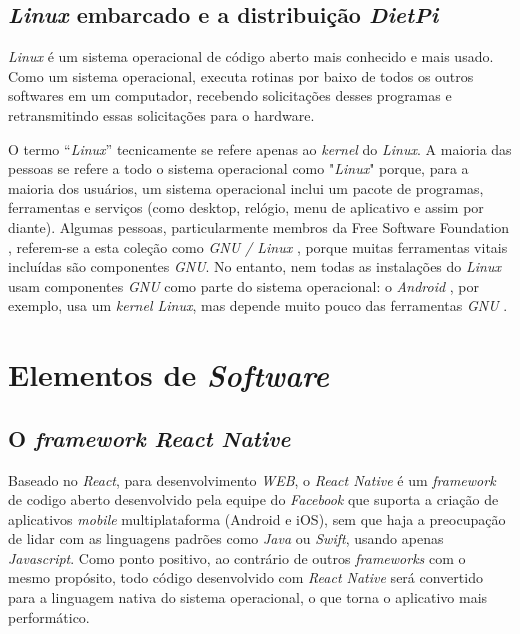 \subsection{\textit{Linux} embarcado e a distribuição \textit{DietPi}}

\textit{Linux} é um sistema operacional de código aberto mais conhecido e mais usado. Como um sistema operacional, executa rotinas por baixo de todos os outros softwares em um computador, recebendo solicitações desses programas e retransmitindo essas solicitações para o hardware.

O termo “\textit{Linux}” tecnicamente se refere apenas ao \textit{kernel} do \textit{Linux}. A maioria das pessoas se refere a todo o sistema operacional como "\textit{Linux}" porque, para a maioria dos usuários, um sistema operacional inclui um pacote de programas, ferramentas e serviços (como desktop, relógio, menu de aplicativo e assim por diante). Algumas pessoas, particularmente membros da Free Software Foundation , referem-se a esta coleção como \textit{GNU / Linux} , porque muitas ferramentas vitais incluídas são componentes \textit{GNU}. No entanto, nem todas as instalações do \textit{Linux} usam componentes \textit{GNU} como parte do sistema operacional: o \textit{Android} , por exemplo, usa um \textit{kernel Linux}, mas depende muito pouco das ferramentas \textit{GNU} \cite{opensource}.







\section{Elementos de \textit{Software}}
\subsection{O \textit{framework React Native}}

Baseado no \textit{React}, para desenvolvimento \textit{WEB}, o \textit{React Native} é um \textit{framework} de codigo aberto desenvolvido pela equipe do \textit{Facebook} que suporta a criação de aplicativos \textit{mobile} multiplataforma (Android e iOS), sem que haja a preocupação de lidar com as linguagens padrões como \textit{Java} ou \textit{Swift}, usando apenas \textit{Javascript}. Como ponto positivo, ao contrário de outros \textit{frameworks} com o mesmo propósito, todo código desenvolvido com \textit{React Native} será convertido para a linguagem nativa do sistema operacional, o que torna o aplicativo mais performático.

